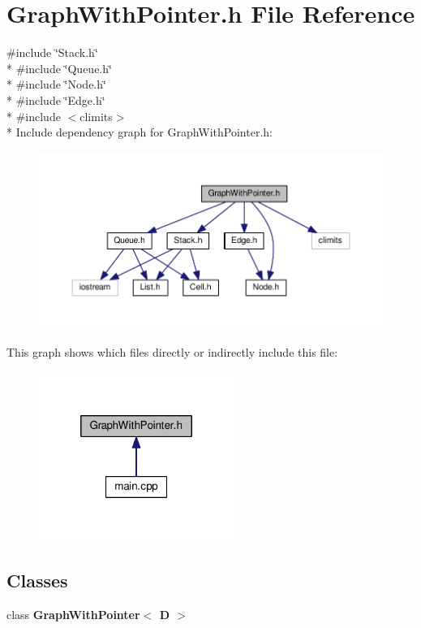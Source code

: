 \section{Graph\-With\-Pointer.\-h File Reference}
\label{_graph_with_pointer_8h}
{\ttfamily \#include \char`\"{}Stack.\-h\char`\"{}}\\*
{\ttfamily \#include \char`\"{}Queue.\-h\char`\"{}}\\*
{\ttfamily \#include \char`\"{}Node.\-h\char`\"{}}\\*
{\ttfamily \#include \char`\"{}Edge.\-h\char`\"{}}\\*
{\ttfamily \#include $<$climits$>$}\\*
Include dependency graph for Graph\-With\-Pointer.\-h\-:
\nopagebreak
\begin{figure}[H]
\begin{center}
\leavevmode
\includegraphics[width=350pt]{_graph_with_pointer_8h__incl}
\end{center}
\end{figure}
This graph shows which files directly or indirectly include this file\-:
\nopagebreak
\begin{figure}[H]
\begin{center}
\leavevmode
\includegraphics[width=180pt]{_graph_with_pointer_8h__dep__incl}
\end{center}
\end{figure}
\subsection*{Classes}
\begin{DoxyCompactItemize}
\item 
class {\bf Graph\-With\-Pointer$<$ D $>$}
\end{DoxyCompactItemize}
